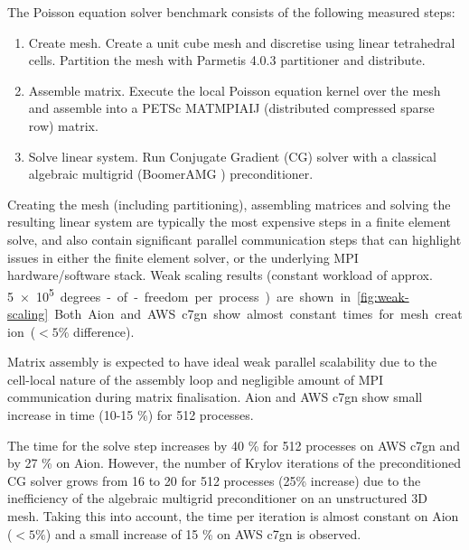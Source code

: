 The Poisson equation solver benchmark consists of the following measured steps:
\begin{enumerate}
    \item Create mesh. Create a unit cube mesh and discretise using linear
    tetrahedral cells. Partition the mesh with Parmetis 4.0.3 partitioner
    \citep{Karypis1998} and distribute.
    \item Assemble matrix. Execute the local Poisson equation kernel over the
    mesh and assemble into a PETSc MATMPIAIJ (distributed compressed sparse row)
    matrix.
    \item Solve linear system. Run Conjugate Gradient (CG) solver with a classical algebraic
    multigrid (BoomerAMG \citep{hypre}) preconditioner.
\end{enumerate}
Creating the mesh (including partitioning), assembling matrices and solving the
resulting linear system are typically the most expensive steps in a finite
element solve, and also contain significant parallel communication steps that
can highlight issues in either the finite element solver, or the underlying MPI
hardware/software stack. 
%
Weak scaling results (constant workload of approx. \SI{5e+5} degrees-of-freedom
per process) are shown in \autoref{fig:weak-scaling}. Both Aion and AWS c7gn
show almost constant times for mesh creation ($< 5\%$ difference).

Matrix assembly is expected to have ideal weak parallel scalability due to the
cell-local nature of the assembly loop and negligible amount of MPI
communication during matrix finalisation. Aion and AWS c7gn show small increase
in time (10-15 \%) for 512 processes.

The time for the solve step increases by 40 \% for 512 processes on AWS c7gn and
by 27 \% on Aion. However, the number of Krylov iterations of the preconditioned
CG solver grows from 16 to 20 for 512 processes (25\% increase) due to the
inefficiency of the algebraic multigrid preconditioner on an unstructured 3D
mesh. Taking this into account, the time per iteration is almost constant on
Aion ($< 5\%$) and a small increase of 15 \% on AWS c7gn is observed.

